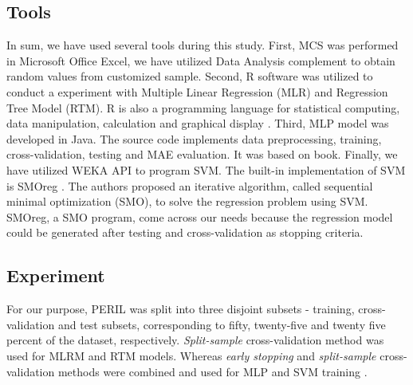 \documentclass[a4paper,twoside]{article}
\begin{document}
\subsection{Tools}
\label{sec:tools}

\noindent In sum, we have used several tools during this study. First, MCS was performed in Microsoft Office Excel, we have utilized Data Analysis complement to obtain random values from customized sample. Second, R software was utilized to conduct a experiment with Multiple Linear Regression (MLR) and Regression Tree Model (RTM). R is also a programming language for statistical computing, data manipulation, calculation and graphical display \cite{venables2002introduction}. Third, MLP model was developed in Java. The source code implements data preprocessing, training, cross-validation, testing and MAE evaluation. It was based on \cite{valenca2005aplicando} book. Finally, we have utilized WEKA API \cite{hall2009weka} to program SVM. The built-in implementation of SVM is SMOreg \cite{Smola1998}. The authors proposed an iterative algorithm, called sequential minimal optimization (SMO), to solve the regression problem using SVM. SMOreg, a SMO program, come across our needs because the regression model could be generated after testing and cross-validation as stopping criteria.

\subsection{Experiment}
\label{sec:experiment}

\noindent For our purpose, PERIL was split into three disjoint subsets - training, cross-validation and test subsets, corresponding to fifty, twenty-five and twenty five percent of the dataset, respectively. \textit{Split-sample} cross-validation method was used for MLRM and RTM models. Whereas \textit{early stopping} and \textit{split-sample} cross-validation methods were combined and used for MLP and SVM training \cite{priddy2005artificial}.
\end{document}
